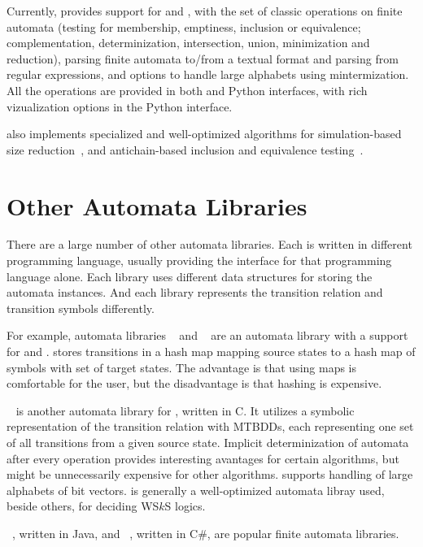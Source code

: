 Currently, \mata provides support for \dfas and \nfas, with the set of classic operations on finite automata (testing for membership, emptiness, inclusion or equivalence; complementation, determinization, intersection, union, minimization and reduction),
parsing finite automata to/from a textual format and parsing \nfas from regular expressions, and options to handle large alphabets using mintermization.
All the operations are provided in both \cpp and Python interfaces, with rich vizualization options in the Python interface.

\mata also implements specialized and well-optimized algorithms for simulation-based size reduction~\cite{ranzato_efficient_2010, treesimulation08}, and antichain-based inclusion and equivalence testing~\cite{doyen-antichain-10}.


\section{Other Automata Libraries}
There are a large number of other automata libraries.
Each is written in different programming language, usually providing the interface for that programming language alone.
Each library uses different data structures for storing the automata instances.
And each library represents the transition relation and transition symbols differently.

For example, automata libraries \fado~\cite{fado} and \automatapy~\cite{automatapy} are an automata library with a support for \nfas and \dfas.
\automatapy stores transitions in a hash map mapping source states to a hash map of symbols with set of target states.
The advantage is that using maps is comfortable for the user, but the disadvantage is that hashing is expensive.

\mona~\cite{mona} is another automata library for \dfas, written in C.
It utilizes a symbolic representation of the transition relation with MTBDDs, each representing one set of all transitions from a given source state.
Implicit determinization of automata after every operation provides interesting avantages for certain algorithms, but might be unnecessarily expensive for other algorithms.
\mona supports handling of large alphabets of bit vectors.
\mona is generally a well-optimized automata libray used, beside others, for deciding WS$k$S logics.

\automatajar~\cite{automatajar}, written in Java, and \automatanet~\cite{automatanet}, written in C\#, are popular finite automata libraries.

